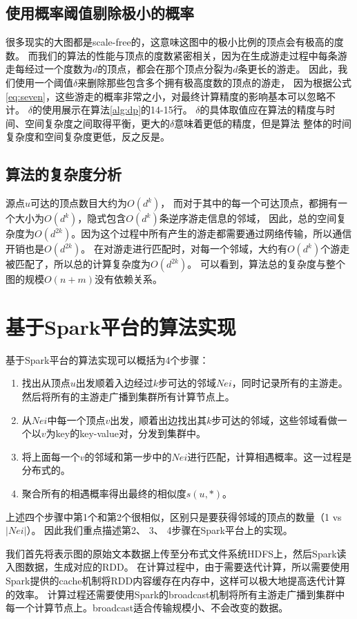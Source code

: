 \documentclass[master]{njuthesis}
\begin{document}
\subsection{使用概率阈值剔除极小的概率}
很多现实的大图都是scale-free\cite{li2005towards}的，这意味这图中的极小比例的顶点会有极高的度数。
而我们的算法的性能与顶点的度数紧密相关，因为在生成游走过程中每条游走每经过一个度数为$d$的顶点，都会在那个顶点分裂为$d$条更长的游走。
因此，我们使用一个阈值\cite{lizorkin2008accuracy}$\delta$来删除那些包含多个拥有极高度数的顶点的游走，
因为根据公式\ref{eq:seven}，这些游走的概率非常之小，对最终计算精度的影响基本可以忽略不计。
$\delta$的使用展示在算法\ref{alg:dp}的14-15行。
$\delta$的具体取值应在算法的精度与时间、空间复杂度之间取得平衡，更大的$\delta$意味着更低的精度，但是算法
整体的时间复杂度和空间复杂度更低，反之反是。
\subsection{算法的复杂度分析}
源点$u$可达的顶点数目大约为$O(d^k)$，
而对于其中的每一个可达顶点，都拥有一个大小为$O(d^k)$，隐式包含$O(d^k)$条逆序游走信息的邻域，
因此，总的空间复杂度为$O(d^{2k})$。因为这个过程中所有产生的游走都需要通过网络传输，所以通信开销也是$O(d^{2k})$。
在对游走进行匹配时，对每一个邻域，大约有$O(d^k)$个游走被匹配了，所以总的计算复杂度为$O(d^{2k})$。
可以看到，算法总的复杂度与整个图的规模$O(n+m)$没有依赖关系。
\section{基于Spark平台的算法实现}
基于Spark平台的算法实现可以概括为4个步骤：
\begin{enumerate}
 \item 找出从顶点$u$出发顺着入边经过$k$步可达的邻域$Nei$，同时记录所有的主游走。然后将所有的主游走广播到集群所有计算节点上。
 \item 从$Nei$中每一个顶点$v$出发，顺着出边找出其$k$步可达的邻域，这些邻域看做一个以$v$为key的key-value对，分发到集群中。
 \item 将上面每一个$v$的邻域和第一步中的$Nei$进行匹配，计算相遇概率。这一过程是分布式的。
 \item 聚合所有的相遇概率得出最终的相似度$s(u,*)$。
\end{enumerate}
上述四个步骤中第1个和第2个很相似，区别只是要获得邻域的顶点的数量（1 vs $|Nei|$）。
因此我们重点描述第2、 3、 4步骤在Spark平台上的实现。

我们首先将表示图的原始文本数据上传至分布式文件系统HDFS上，然后Spark读入图数据，生成对应的RDD。
在计算过程中，由于需要迭代计算，所以需要使用Spark提供的cache机制将RDD内容缓存在内存中，这样可以极大地提高迭代计算的效率。
计算过程还需要使用Spark的broadcast机制将所有主游走广播到集群中每一个计算节点上。broadcast适合传输规模小、不会改变的数据。
\end{document}
